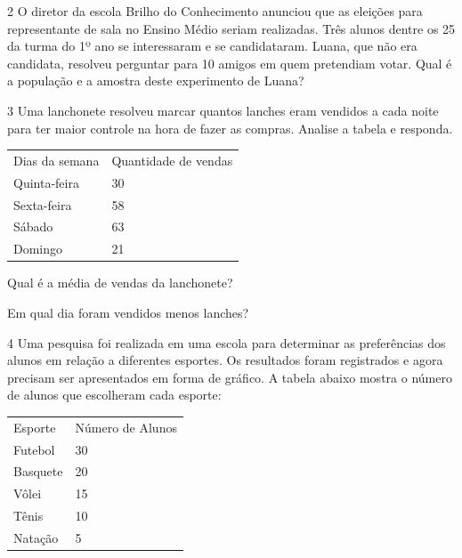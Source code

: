 \num{2} O diretor da escola Brilho do Conhecimento anunciou que as eleições
para representante de sala no Ensino Médio seriam realizadas. Três
alunos dentre os 25 da turma do 1º ano se interessaram e se
candidataram. Luana, que não era candidata, resolveu perguntar para 10
amigos em quem pretendiam votar. Qual é a população e a amostra deste
experimento de Luana?


\num{3} Uma lanchonete resolveu marcar quantos lanches eram vendidos a cada
noite para ter maior controle na hora de fazer as compras. Analise a
tabela e responda.

\begin{longtable}[]{@{}ll@{}}
\toprule
\endhead
Dias da semana & Quantidade de vendas\tabularnewline
Quinta-feira~ & 30\tabularnewline
Sexta-feira & 58\tabularnewline
Sábado & 63\tabularnewline
Domingo & 21\tabularnewline
\bottomrule
\end{longtable}

\begin{escolha}[itemsep=0pt]

    \item Qual é a média de vendas da lanchonete?

    \item{}

    \item Em qual dia foram vendidos menos lanches?

    \item {}

\end{escolha}

\num{4} Uma pesquisa foi realizada em uma escola para determinar as
preferências dos alunos em relação a diferentes esportes. Os resultados
foram registrados e agora precisam ser apresentados em forma de gráfico.
A tabela abaixo mostra o número de alunos que escolheram cada
esporte:

\begin{longtable}[]{@{}ll@{}}
\toprule
\tabularnewline
\midrule
\endhead
Esporte & Número de Alunos\tabularnewline
Futebol & 30\tabularnewline
Basquete & 20\tabularnewline
Vôlei & 15\tabularnewline
Tênis & 10\tabularnewline
Natação & 5\tabularnewline
\bottomrule
\end{longtable}

